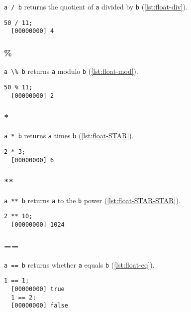 \lstinline|a / b| returns the quotient of \lstinline|a| divided by
\lstinline|b| (\autoref{lst:float-div}).

\begin{lstlisting}[caption=Float.'/', label=lst:float-div, float=\floatposh]
  50 / 11;
  [00000000] 4
\end{lstlisting}

\subsubsection{\%}

\lstinline|a \% b| returns \lstinline|a| modulo \lstinline|b| (\autoref{lst:float-mod}).

\begin{lstlisting}[caption=Float.'\%', label=lst:float-mod, float=\floatposh]
  50 % 11;
  [00000000] 2
\end{lstlisting}

\subsubsection{*}

\lstinline|a * b| returns \lstinline|a| times \lstinline|b| (\autoref{lst:float-STAR}).

\begin{lstlisting}[caption=Float.'*', label=lst:float-STAR, float=\floatposh]
  2 * 3;
  [00000000] 6
\end{lstlisting}

\subsubsection{**}

\lstinline|a ** b| returns \lstinline|a| to the \lstinline|b| power (\autoref{lst:float-STAR-STAR}).

\begin{lstlisting}[caption=Float.'**', label=lst:float-STAR-STAR, float=\floatposh]
  2 ** 10;
  [00000000] 1024
\end{lstlisting}

\subsubsection{==}

\lstinline|a == b| returns whether \lstinline|a| equals \lstinline|b| (\autoref{lst:float-eq}).

\begin{lstlisting}[caption={Float.'=='}, label=lst:float-eq, float=\floatposh]
  1 == 1;
  [00000000] true
  1 == 2;
  [00000000] false
\end{lstlisting}
